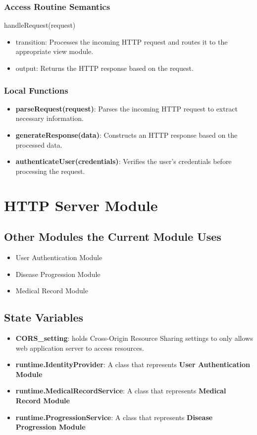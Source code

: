 \documentclass[12pt, titlepage]{article}
\begin{document}
\subsubsection{Access Routine Semantics}

handleRequest(request)
\begin{itemize}
  \item transition:  Processes the incoming HTTP request and routes it to the appropriate view module.
  \item output: Returns the HTTP response based on the request.
\end{itemize}
\subsubsection{Local Functions}
\begin{itemize}
  \item \textbf{parseRequest(request)}: Parses the incoming HTTP request to extract necessary information.
  \item \textbf{generateResponse(data)}: Constructs an HTTP response based on the processed data.
  \item \textbf{authenticateUser(credentials)}: Verifies the user's credentials before processing the request.
\end{itemize}
\newpage

\newpage
\section{HTTP Server Module}

\subsection{Other Modules the Current Module Uses}
\begin{itemize}
  \item User Authentication Module
  \item Disease Progression Module
  \item Medical Record Module
\end{itemize}

\subsection{State Variables}
\begin{itemize}
    \item \textbf{CORS\_setting}: holds Cross-Origin Resource Sharing settings to only allows web application server to access resources. 
    \item \textbf{runtime.IdentityProvider}: A class that represents \textbf{User Authentication Module}
    \item \textbf{runtime.MedicalRecordService}: A class that represents \textbf{Medical Record Module}
    \item \textbf{runtime.ProgressionService}: A class that represents \textbf{Disease Progression Module}
\end{itemize}
\end{document}
